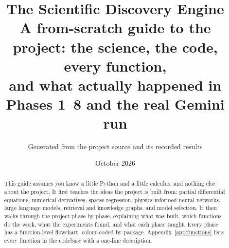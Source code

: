 \documentclass[11pt,a4paper]{article}
\title{\textbf{The Scientific Discovery Engine}\\[4pt]
\large A from-scratch guide to the project: the science, the code, every function,\\
and what actually happened in Phases 1--8 and the real Gemini run}
\author{Generated from the project source and its recorded results}
\date{October 2026}
\begin{document}
\maketitle
\thispagestyle{empty}

\begin{abstract}
\noindent This guide assumes you know a little Python and a little calculus, and nothing else about the
project. It first teaches the ideas the project is built from: partial differential equations, numerical
derivatives, sparse regression, physics-informed neural networks, large language models, retrieval and
knowledge graphs, and model selection. It then walks through the project phase by phase, explaining what was
built, which functions do the work, what the experiments found, and what each phase taught. Every phase has a
function-level flowchart, colour-coded by package. Appendix~\ref{app:functions} lists every function in the
codebase with a one-line description.
\end{abstract}

\tableofcontents
\clearpage








\appendix


\end{document}
